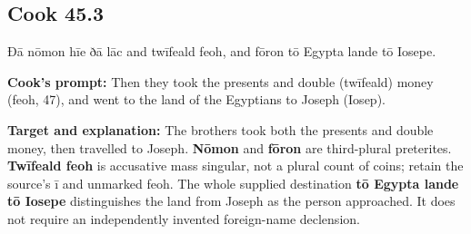 \par\begin{minipage}{\linewidth}\raggedright
\subsection*{Cook 45.3}

Ðā nōmon hīe ðā lāc and twīfeald feoh, and fōron tō Egypta lande tō Iosepe.

\textbf{Cook’s prompt:} Then they took the presents and double (twīfeald) money (feoh, 47), and went to the land of the Egyptians to Joseph (Iosep).

\textbf{Target and explanation:} The brothers took both the presents and double money, then travelled to Joseph. \textbf{Nōmon} and \textbf{fōron} are third-plural preterites. \textbf{Twīfeald feoh} is accusative mass singular, not a plural count of coins; retain the source’s ī and unmarked feoh. The whole supplied destination \textbf{tō Egypta lande tō Iosepe} distinguishes the land from Joseph as the person approached. It does not require an independently invented foreign-name declension.

\end{minipage}\par\addvspace{4pt}

